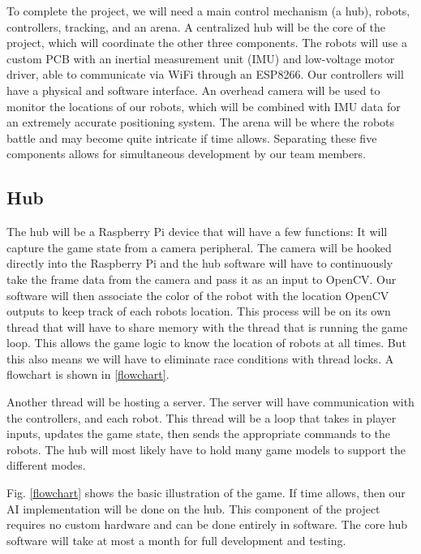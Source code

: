 \documentclass[11pt]{ieeeconf}
\begin{document}
To complete the project, we will need a main control mechanism (a hub), robots, controllers, tracking, and an arena. A centralized hub will be the core of the project, which will coordinate the other three components. The robots will use a custom PCB with an inertial measurement unit (IMU) and low-voltage motor driver, able to communicate via WiFi through an ESP8266. Our controllers will have a physical and software interface. An overhead camera will be used to monitor the locations of our robots, which will be combined with IMU data for an extremely accurate positioning system. The arena will be where the robots battle and may become quite intricate if time allows. Separating these five components allows for simultaneous development by our team members.

\subsection{Hub}
The hub will be a Raspberry Pi device that will have a few functions:
It will capture the game state from a camera peripheral. The camera will be hooked directly into the Raspberry Pi and the hub software will have to continuously take the frame data from the camera and pass it as an input to OpenCV. Our software will then associate the color of the robot with the location OpenCV outputs to keep track of each robots location. This process will be on its own thread that will have to share memory with the thread that is running the game loop. This allows the game logic to know the location of robots at all times. But this also means we will have to eliminate race conditions with thread locks. A flowchart is shown in \ref{flowchart}.

Another thread will be hosting a server. The server will have communication with the controllers, and each robot. This thread will be a loop that takes in player inputs, updates the game state, then sends the appropriate commands to the robots. The hub will most likely have to hold many game models to support the different modes.

Fig. \ref{flowchart} shows the basic illustration of the game. If time allows, then our AI implementation will be done on the hub. This component of the project requires no custom hardware and can be done entirely in software. The core hub software will take at most a month for full development and testing. 
\end{document}
